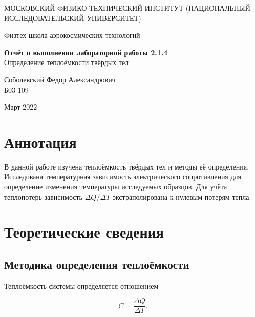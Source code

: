 \documentclass[a4paper,12pt]{article} %
\date{\today}
\begin{document}
\begin{titlepage}
	\begin{center}
		{\large МОСКОВСКИЙ ФИЗИКО-ТЕХНИЧЕСКИЙ ИНСТИТУТ (НАЦИОНАЛЬНЫЙ ИССЛЕДОВАТЕЛЬСКИЙ УНИВЕРСИТЕТ)}
	\end{center}
	\begin{center}
		{\large Физтех-школа аэрокосмических технологий}
	\end{center}
	
	
	\vspace{4.5cm}
	{\huge
		\begin{center}
			{\bf Отчёт о выполнении лабораторной работы 2.1.4}\\
			Определение теплоёмкости твёрдых тел
		\end{center}
	}
	\vspace{1cm}
	\begin{center}
		{\large Соболевский Федор Александрович \\
			\vspace{0.2cm}
			Б03-109}
	\end{center}
	\vspace{8cm}
	\begin{center}
		Март 2022
	\end{center}
\end{titlepage}

\section{Аннотация}

В данной работе изучена теплоёмкость твёрдых тел и методы её определения. Исследована температурная зависимость электрического сопротивления для определение изменения температуры исследуемых образцов. Для учёта теплопотерь зависимость $\Delta Q/ \Delta T$ экстраполирована к нулевым потерям тепла.

\section{Теоретические сведения}

\subsection{Методика определения теплоёмкости}

Теплоёмкость системы определяется отношением

\begin{equation}
    C = \frac{\Delta Q}{\Delta T}.
    \label{capacityDef}
\end{equation}
\end{document}
